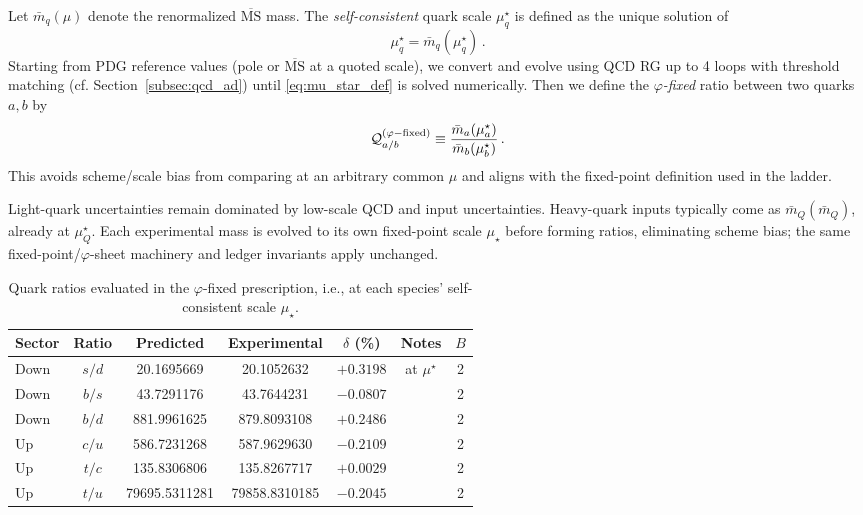 \documentclass[%
amsmath,amssymb,
aps,
prb,
floatfix,showkeys
]{revtex4-2}
\begin{document}
Let $\bar m_q(\mu)$ denote the renormalized $\overline{\mathrm{MS}}$ mass. The \emph{self-consistent} quark scale $\mu^\star_q$ is defined as the unique solution of
\begin{equation}
  \mu^\star_q = \bar m_q(\mu^\star_q)\,.
  \label{eq:mu_star_def}
\end{equation}
Starting from PDG reference values (pole or $\overline{\mathrm{MS}}$ at a quoted scale), we convert and evolve using QCD RG up to 4 loops with threshold matching (cf. Section~\ref{subsec:qcd_ad}) until \eqref{eq:mu_star_def} is solved numerically. Then we define the \emph{$\varphi$-fixed} ratio between two quarks $a,b$ by
\begin{equation}
  \mathcal{Q}_{a/b}^{(\varphi\rm{-fixed})}
  \equiv \frac{\bar m_a(\mu^\star_a)}{\bar m_b(\mu^\star_b)}\,.
  \label{eq:phi_fixed_ratio}
\end{equation}
This avoids scheme/scale bias from comparing at an arbitrary common $\mu$ and aligns with the fixed-point definition used in the ladder.

Light-quark uncertainties remain dominated by low-scale QCD and input uncertainties. Heavy-quark inputs typically come as $\bar m_Q(\bar m_Q)$, already at $\mu^\star_Q$. Each experimental mass is evolved to its own fixed-point scale $\mu_\star$ before forming ratios, eliminating scheme bias; the same fixed-point/$\varphi$-sheet machinery and ledger invariants apply unchanged.

\begin{table}[H]
\caption{Quark ratios evaluated in the $\varphi$-fixed prescription, i.e., at each species' self-consistent scale $\mu_\star$.}
\label{tab:quarks}
\begin{tabular}{l c c c c c c}
\hline
Sector & Ratio & Predicted & Experimental & $\delta$ (\%) & Notes & $B$ \\
\hline
Down & $s/d$ & 20.1695669   & 20.1052632   & $+0.3198$ & at $\mu^\star$ & 2 \\
Down & $b/s$ & 43.7291176   & 43.7644231   & $-0.0807$ &                & 2 \\
Down & $b/d$ & 881.9961625  & 879.8093108  & $+0.2486$ &                & 2 \\
Up   & $c/u$ & 586.7231268  & 587.9629630  & $-0.2109$ &                & 2 \\
Up   & $t/c$ & 135.8306806  & 135.8267717  & $+0.0029$ &                & 2 \\
Up   & $t/u$ & 79695.5311281 & 79858.8310185 & $-0.2045$ &               & 2 \\
\hline
\end{tabular}
\end{table}
\end{document}
